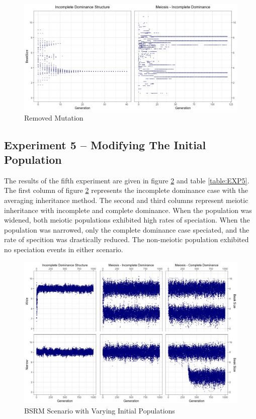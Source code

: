 \documentclass{article}
\begin{document}
\begin{figure} [ht!]
    \centering
    \includegraphics[width=\linewidth]{Data/EXP4}
    \caption{Removed Mutation}
    \label{fig:EXP4}
\end{figure}



\subsection{Experiment 5 -- Modifying The Initial Population} 

The results of the fifth experiment are given in figure \ref{fig:EXP5} and table \ref{table:EXP5}. The first column of figure \ref{fig:EXP5} represents the incomplete dominance case with the averaging inheritance method. The second and third columns represent meiotic inheritance with incomplete and complete dominance. When the population was widened, both meiotic populations exhibited high rates of speciation. When the population was narrowed, only the complete dominance case speciated, and the rate of specition was drastically reduced. The non-meiotic population exhibited no speciation events in either scenario. 

\begin{figure} [ht!]
    \centering
    \includegraphics[width=\linewidth]{Data/EXP5}
    \caption{BSRM Scenario with Varying Initial Populations}
    \label{fig:EXP5}
\end{figure}
\end{document}
